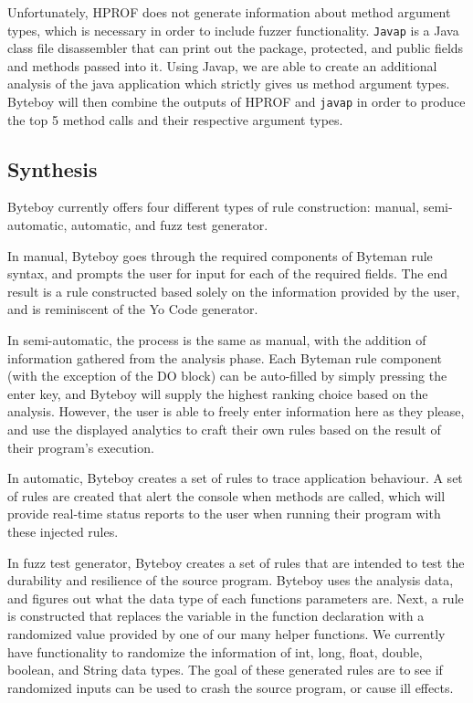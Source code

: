 \documentclass[letterpaper,twocolumn,10pt]{article}
\begin{document}
Unfortunately, HPROF does not generate information about method argument types, which is necessary in order to include fuzzer functionality. {\tt Javap} is a Java class file disassembler that can print out the package, protected, and public fields and methods passed into it\cite{javap}. Using Javap, we are able to create an additional analysis of the java application which strictly gives us method argument types. Byteboy will then combine the outputs of HPROF and {\tt javap} in order to produce the top 5 method calls and their respective argument types.  

\subsection{Synthesis}

Byteboy currently offers four different types of rule construction: manual, semi-automatic, automatic, and fuzz test generator.

In manual, Byteboy goes through the required components of Byteman rule syntax, and prompts the user for input for each of the required fields. The end result is a rule constructed based solely on the information provided by the user, and is reminiscent of the Yo Code generator\cite{yocode}.

In semi-automatic, the process is the same as manual, with the addition of information gathered from the analysis phase. Each Byteman rule component (with the exception of the DO block) can be auto-filled by simply pressing the enter key, and Byteboy will supply the highest ranking choice based on the analysis. However, the user is able to freely enter information here as they please, and use the displayed analytics to craft their own rules based on the result of their program's execution.

In automatic, Byteboy creates a set of rules to trace application behaviour. A set of rules are created that alert the console when methods are called, which will provide real-time status reports to the user when running their program with these injected rules.

In fuzz test generator, Byteboy creates a set of rules that are intended to test the durability and resilience of the source program. Byteboy uses the analysis data, and figures out what the data type of each functions parameters are. Next, a rule is constructed that replaces the variable in the function declaration with a randomized value provided by one of our many helper functions. We currently have functionality to randomize the information of int, long, float, double, boolean, and String data types. The goal of these generated rules are to see if randomized inputs can be used to crash the source program, or cause ill effects.   
\end{document}
